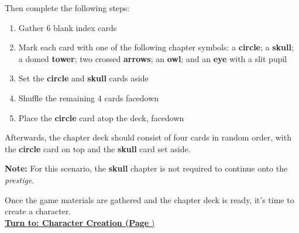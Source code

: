 \documentclass[12pt]{article}
\begin{document}
\begin{multicols*}{2}
Then complete the following steps:

\begin{enumerate}
\item Gather 6 blank index cards
\item Mark each card with one of the following chapter symbols: a \textbf{circle}; a \textbf{skull}; a domed \textbf{tower}; two crossed \textbf{arrows}; an \textbf{owl}; and an \textbf{eye} with a slit pupil 
\item Set the \textbf{circle} and \textbf{skull} cards aside
\item Shuffle the remaining 4 cards facedown
\item Place the \textbf{circle} card atop the deck, facedown
\end{enumerate}

Afterwards, the chapter deck should consist of four cards in random order, with the \textbf{circle} card on top and the \textbf{skull} card set aside.
\begin{tcolorbox}
\textbf{Note:} For this scenario, the \textbf{skull} chapter is not required to continue onto the \emph{prestige}.
\end{tcolorbox}
Once the game materials are gathered and the chapter deck is ready, it’s time to create a character.\\

\hyperlink{chargen}{\textbf{Turn to: Character Creation (Page \pageref{chargen}})}


\end{multicols*}
\end{document}
